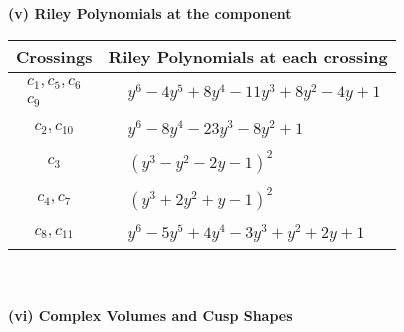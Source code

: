 \documentclass[1p]{elsarticle_modified}
\theoremstyle{definition}
\begin{document}
\newpage\renewcommand{\arraystretch}{1}
\flushleft \textbf{(v) Riley Polynomials at the component}\newline \\
\begin{tabular}{m{50pt}|m{274pt}}
Crossings & \hspace{64pt}Riley Polynomials at each crossing \\
\hline $$\begin{aligned}c_{1},c_{5},c_{6}\\c_{9}\end{aligned}$$&$\begin{aligned}
&y^6-4 y^5+8 y^4-11 y^3+8 y^2-4 y+1
\end{aligned}$\\
\hline $$\begin{aligned}c_{2},c_{10}\end{aligned}$$&$\begin{aligned}
&y^6-8 y^4-23 y^3-8 y^2+1
\end{aligned}$\\
\hline $$\begin{aligned}c_{3}\end{aligned}$$&$\begin{aligned}
&(y^3- y^2-2 y-1)^2
\end{aligned}$\\
\hline $$\begin{aligned}c_{4},c_{7}\end{aligned}$$&$\begin{aligned}
&(y^3+2 y^2+y-1)^2
\end{aligned}$\\
\hline $$\begin{aligned}c_{8},c_{11}\end{aligned}$$&$\begin{aligned}
&y^6-5 y^5+4 y^4-3 y^3+y^2+2 y+1
\end{aligned}$\\
\hline
\end{tabular}\\~\\
\newpage\flushleft \textbf{(vi) Complex Volumes and Cusp Shapes}
\end{document}
